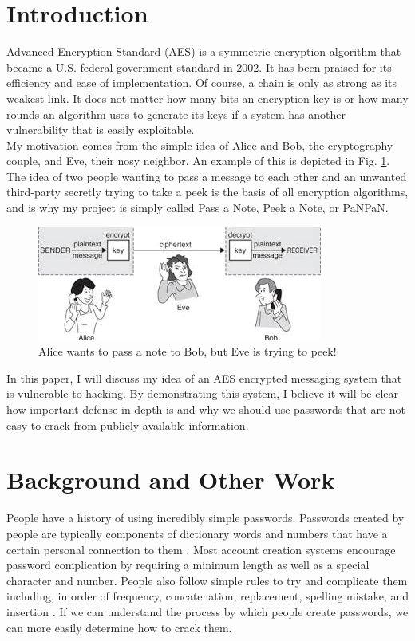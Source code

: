\documentclass[conference]{csce}
\begin{document}
\section{Introduction}
Advanced Encryption Standard (AES) is a symmetric encryption algorithm that became a U.S. federal government standard in 2002. It has been praised for its efficiency and ease of implementation. Of course, a chain is only as strong as its weakest link. It does not matter how many bits an encryption key is or how many rounds an algorithm uses to generate its keys if a system has another vulnerability that is easily exploitable. \\
\indent My motivation comes from the simple idea of Alice and Bob, the cryptography couple, and Eve, their nosy neighbor. An example of this is depicted in Fig. \ref{fig:abe}. The idea of two people wanting to pass a message to each other and an unwanted third-party secretly trying to take a peek is the basis of all encryption algorithms, and is why my project is simply called Pass a Note, Peek a Note, or PaNPaN. \\
\begin{figure}
    \centering
    \includegraphics[width=\columnwidth]{AliceBobEve.jpeg}
    \caption{Alice wants to pass a note to Bob, but Eve is trying to peek!}
    \label{fig:abe}
\end{figure}
\indent In this paper, I will discuss my idea of an AES encrypted messaging system that is vulnerable to hacking. By demonstrating this system, I believe it will be clear how important defense in depth is and why we should use passwords that are not easy to crack from publicly available information. 

\section{Background and Other Work}
People have a history of using incredibly simple passwords. Passwords created by people are typically components of dictionary words and numbers that have a certain personal connection to them \cite{understanding passwords}. Most account creation systems encourage password complication by requiring a minimum length as well as a special character and number. People also follow simple rules to try and complicate them including, in order of frequency, concatenation, replacement, spelling mistake, and insertion \cite{understanding passwords}. If we can understand the process by which people create passwords, we can more easily determine how to crack them. 
\end{document}
